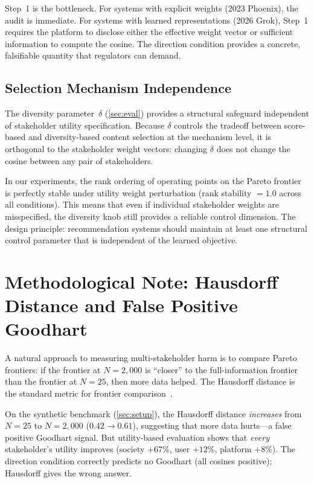 \documentclass[11pt,letterpaper]{article}
\begin{document}
Step~1 is the bottleneck. For systems with explicit weights (2023
Phoenix), the audit is immediate. For systems with learned
representations (2026 Grok), Step~1 requires the platform to
disclose either the effective weight vector or sufficient
information to compute the cosine. The direction condition provides
a concrete, falsifiable quantity that regulators can demand.

\subsection{Selection Mechanism Independence}

The diversity parameter~$\delta$ (\cref{sec:eval}) provides a
structural safeguard independent of stakeholder utility
specification. Because $\delta$ controls the tradeoff between
score-based and diversity-based content selection at the mechanism
level, it is orthogonal to the stakeholder weight vectors: changing
$\delta$ does not change the cosine between any pair of
stakeholders.

In our experiments, the rank ordering of operating points on the
Pareto frontier is perfectly stable under utility weight
perturbation (rank stability $= 1.0$ across all conditions). This
means that even if individual stakeholder weights are misspecified,
the diversity knob still provides a reliable control dimension. The
design principle: recommendation systems should maintain at least
one structural control parameter that is independent of the
learned objective.

\section{Methodological Note: Hausdorff Distance and False Positive Goodhart}
\label{sec:hausdorff}

A natural approach to measuring multi-stakeholder harm is to compare
Pareto frontiers: if the frontier at $N = 2{,}000$ is ``closer'' to
the full-information frontier than the frontier at $N = 25$, then more
data helped. The Hausdorff distance is the standard metric for
frontier comparison~\cite{iancu2014pareto}.

On the synthetic benchmark (\cref{sec:setup}), the Hausdorff distance
\emph{increases} from $N = 25$ to $N = 2{,}000$ ($0.42 \to 0.61$),
suggesting that more data hurts---a false positive Goodhart signal.
But utility-based evaluation shows that \emph{every} stakeholder's
utility improves (society $+67\%$, user $+12\%$, platform $+8\%$).
The direction condition correctly predicts no Goodhart (all cosines
positive); Hausdorff gives the wrong answer.
\end{document}
